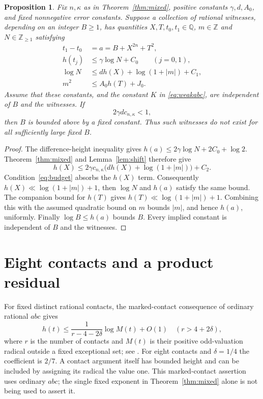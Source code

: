 \documentclass[11pt]{article}
\newcommand{\Q}{\mathbb Q}
\newcommand{\Z}{\mathbb Z}
\newtheorem{proposition}[theorem]{Proposition}
\begin{document}
\begin{proposition}\label{prop:budget}
Fix $n,\kappa$ as in Theorem~\ref{thm:mixed}, positive constants
$\gamma,d,A_0$, and fixed nonnegative error constants.
Suppose a collection of rational witnesses, depending on an integer
$B\ge1$, has quantities $X,T,t_0,t_1\in\Q$,
$m\in\Z$ and $N\in\Z_{\ge1}$ satisfying
\begin{align*}
 t_1-t_0&=a=B+X^{2n}+T^2,\\
 h(t_j)&\le\gamma\log N+C_0\qquad(j=0,1),\\
 \log N&\le d h(X)+\log(1+|m|)+C_1,\\
 m^2&\le A_0h(T)+J_0.
\end{align*}
Assume that these constants, and the constant $K$ in
\eqref{eq:weakabc}, are independent of $B$ and the witnesses.
If
\begin{equation}\label{eq:budget}
                         2\gamma d c_{n,\kappa}<1,
\end{equation}
then $B$ is bounded above by a fixed constant. Thus such witnesses
do not exist for all sufficiently large fixed $B$.
\end{proposition}
\begin{proof}
The difference-height inequality gives
$h(a)\le2\gamma\log N+2C_0+\log2$.
Theorem~\ref{thm:mixed} and Lemma~\ref{lem:shift} therefore give
\[
 h(X)\le2\gamma c_{n,\kappa}
       \bigl(dh(X)+\log(1+|m|)\bigr)+C_2.
\]
Condition~\eqref{eq:budget} absorbs the $h(X)$ term. Consequently
$h(X)\ll\log(1+|m|)+1$, then $\log N$ and $h(a)$ satisfy
the same bound. The companion bound for $h(T)$ gives
$h(T)\ll\log(1+|m|)+1$. Combining this with the assumed quadratic
bound on $m$ bounds $|m|$, and hence $h(a)$, uniformly. Finally
$\log B\le h(a)$ bounds $B$. Every implied constant is independent
of $B$ and the witnesses.
\end{proof}

\section{Eight contacts and a product residual}

For fixed distinct rational contacts, the marked-contact consequence
of ordinary rational $abc$ gives
\[
 h(t)\le\frac1{r-4-2\delta}\log M(t)+O(1)
 \quad(r>4+2\delta),
\]
where $r$ is the number of contacts and $M(t)$ is their positive
odd-valuation radical outside a fixed exceptional set; see
\cite[Section~2]{Marked}. For eight contacts and $\delta=1/4$ the
coefficient is $2/7$. A contact argument itself has bounded height
and can be included by assigning its radical the value one.
This marked-contact assertion uses ordinary $abc$; the single fixed
exponent in Theorem~\ref{thm:mixed} alone is not being used to assert it.
\end{document}
